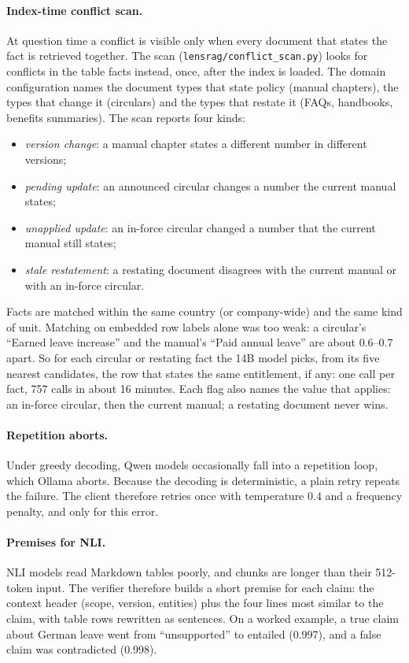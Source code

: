 \documentclass[11pt,letterpaper,oneside]{report}
\begin{document}
\paragraph{Index-time conflict scan.}
At question time a conflict is visible only when every document that states
the fact is retrieved together. The scan (\texttt{lensrag/conflict\_scan.py})
looks for conflicts in the table facts instead, once, after the index is
loaded. The domain configuration names the document types that state policy
(manual chapters), the types that change it (circulars) and the types that
restate it (FAQs, handbooks, benefits summaries). The scan reports four kinds:
\begin{itemize}
  \item \emph{version change}: a manual chapter states a different number in
  different versions;
  \item \emph{pending update}: an announced circular changes a number the
  current manual states;
  \item \emph{unapplied update}: an in-force circular changed a number that
  the current manual still states;
  \item \emph{stale restatement}: a restating document disagrees with the
  current manual or with an in-force circular.
\end{itemize}
Facts are matched within the same country (or company-wide) and the same
kind of unit. Matching on embedded row labels alone was too weak: a
circular's ``Earned leave increase'' and the manual's ``Paid annual leave''
are about 0.6--0.7 apart. So for each circular or restating fact the 14B model
picks, from its five nearest candidates, the row that states the same
entitlement, if any: one call per fact, 757 calls in about 16 minutes. Each
flag also names the value that applies: an in-force circular, then the
current manual; a restating document never wins.

\paragraph{Repetition aborts.}
Under greedy decoding, Qwen models occasionally fall into a repetition loop,
which Ollama aborts. Because the decoding is deterministic, a plain retry
repeats the failure. The client therefore retries once with temperature 0.4
and a frequency penalty, and only for this error.

\paragraph{Premises for NLI.}
NLI models read Markdown tables poorly, and chunks are longer than their
512-token input. The verifier therefore builds a short premise for each
claim: the context header (scope, version, entities) plus the four lines most
similar to the claim, with table rows rewritten as sentences. On a worked
example, a true claim about German leave went from ``unsupported'' to
entailed (0.997), and a false claim was contradicted (0.998).
\end{document}
